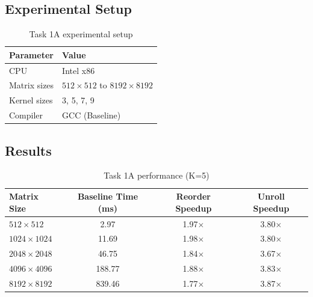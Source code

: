 \subsection{Experimental Setup}
\begin{table}[H]
\centering
\caption{Task 1A experimental setup}
\begin{tabular}{ll}
\toprule
Parameter & Value \\
\midrule
CPU & Intel x86 \\
Matrix sizes & $512 \times 512$ to $8192 \times 8192$ \\
Kernel sizes & 3, 5, 7, 9 \\
Compiler & GCC (Baseline) \\
\bottomrule
\end{tabular}
\end{table}

\subsection{Results}
\begin{table}[H]
\centering
\caption{Task 1A performance (K=5)}
\begin{tabular}{lccc}
\toprule
Matrix Size & Baseline Time (ms) & Reorder Speedup & Unroll Speedup \\
\midrule
$512 \times 512$ & 2.97 & 1.97$\times$ & 3.80$\times$ \\
$1024 \times 1024$ & 11.69 & 1.98$\times$ & 3.80$\times$ \\
$2048 \times 2048$ & 46.75 & 1.84$\times$ & 3.67$\times$ \\
$4096 \times 4096$ & 188.77 & 1.88$\times$ & 3.83$\times$ \\
$8192 \times 8192$ & 839.46 & 1.77$\times$ & 3.87$\times$ \\
\bottomrule
\end{tabular}
\end{table}

